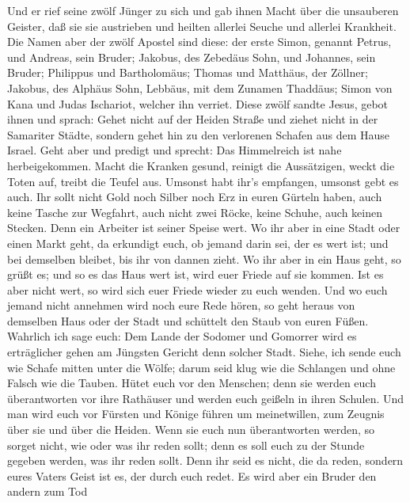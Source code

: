  Und er rief seine zwölf Jünger zu sich und gab ihnen Macht
über die unsauberen Geister, daß sie sie austrieben und heilten allerlei
Seuche und allerlei Krankheit.  Die Namen aber der zwölf
Apostel sind diese: der erste Simon, genannt Petrus, und Andreas, sein
Bruder; Jakobus, des Zebedäus Sohn, und Johannes, sein Bruder;
 Philippus und Bartholomäus; Thomas und Matthäus, der
Zöllner; Jakobus, des Alphäus Sohn, Lebbäus, mit dem Zunamen Thaddäus;
 Simon von Kana und Judas Ischariot, welcher ihn verriet.
 Diese zwölf sandte Jesus, gebot ihnen und sprach: Gehet
nicht auf der Heiden Straße und ziehet nicht in der Samariter Städte,
 sondern gehet hin zu den verlorenen Schafen aus dem Hause
Israel.  Geht aber und predigt und sprecht: Das Himmelreich
ist nahe herbeigekommen.  Macht die Kranken gesund, reinigt
die Aussätzigen, weckt die Toten auf, treibt die Teufel aus. Umsonst
habt ihr's empfangen, umsonst gebt es auch.  Ihr sollt nicht
Gold noch Silber noch Erz in euren Gürteln haben,  auch
keine Tasche zur Wegfahrt, auch nicht zwei Röcke, keine Schuhe, auch
keinen Stecken. Denn ein Arbeiter ist seiner Speise wert. 
Wo ihr aber in eine Stadt oder einen Markt geht, da erkundigt euch, ob
jemand darin sei, der es wert ist; und bei demselben bleibet, bis ihr
von dannen zieht.  Wo ihr aber in ein Haus geht, so grüßt
es;  und so es das Haus wert ist, wird euer Friede auf sie
kommen. Ist es aber nicht wert, so wird sich euer Friede wieder zu euch
wenden.  Und wo euch jemand nicht annehmen wird noch eure
Rede hören, so geht heraus von demselben Haus oder der Stadt und
schüttelt den Staub von euren Füßen.  Wahrlich ich sage
euch: Dem Lande der Sodomer und Gomorrer wird es erträglicher gehen am
Jüngsten Gericht denn solcher Stadt.  Siehe, ich sende euch
wie Schafe mitten unter die Wölfe; darum seid klug wie die Schlangen und
ohne Falsch wie die Tauben.  Hütet euch vor den Menschen;
denn sie werden euch überantworten vor ihre Rathäuser und werden euch
geißeln in ihren Schulen.  Und man wird euch vor Fürsten
und Könige führen um meinetwillen, zum Zeugnis über sie und über die
Heiden.  Wenn sie euch nun überantworten werden, so sorget
nicht, wie oder was ihr reden sollt; denn es soll euch zu der Stunde
gegeben werden, was ihr reden sollt.  Denn ihr seid es
nicht, die da reden, sondern eures Vaters Geist ist es, der durch euch
redet.  Es wird aber ein Bruder den andern zum Tod

